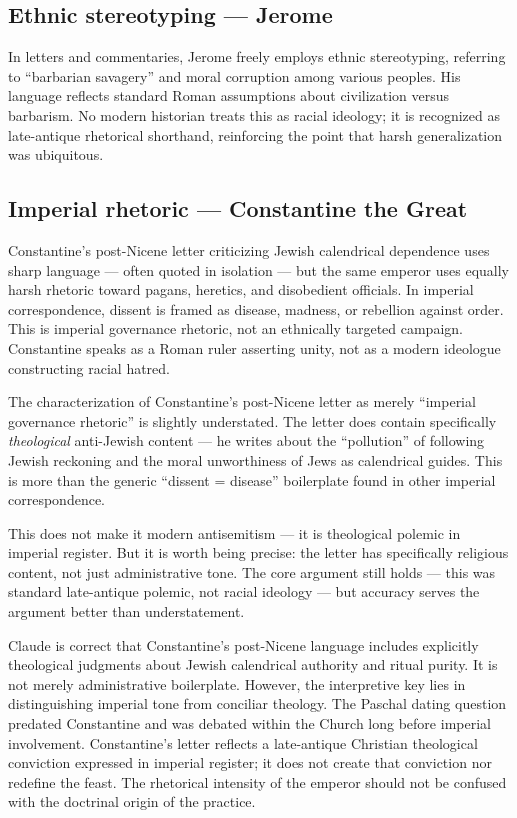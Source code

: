 \documentclass[10pt,twoside,openany]{book}
\begin{document}
\subsection{Ethnic stereotyping --- Jerome}

In letters and commentaries, Jerome freely employs ethnic stereotyping,
referring to ``barbarian savagery'' and moral corruption among various
peoples. His language reflects standard Roman assumptions about
civilization versus barbarism. No modern historian treats this as racial
ideology; it is recognized as late-antique rhetorical shorthand,
reinforcing the point that harsh generalization was ubiquitous.

\subsection{Imperial rhetoric --- Constantine the Great}

Constantine's post-Nicene letter criticizing Jewish calendrical
dependence uses sharp language --- often quoted in isolation --- but the
same emperor uses equally harsh rhetoric toward pagans, heretics, and
disobedient officials. In imperial correspondence, dissent is framed
as disease, madness, or rebellion against order. This is imperial
governance rhetoric, not an ethnically targeted campaign. Constantine
speaks as a Roman ruler asserting unity, not as a modern ideologue
constructing racial hatred.

\begin{reviewerbox}
The characterization of Constantine's post-Nicene
letter as merely ``imperial governance rhetoric'' is
slightly understated. The letter does contain
specifically \emph{theological} anti-Jewish content --- he
writes about the ``pollution'' of following Jewish
reckoning and the moral unworthiness of Jews as
calendrical guides. This is more than the generic
``dissent = disease'' boilerplate found in other imperial
correspondence.

This does not make it modern antisemitism --- it is
theological polemic in imperial register. But it is
worth being precise: the letter has specifically
religious content, not just administrative tone. The
core argument still holds --- this was standard late-antique polemic, not racial ideology --- but accuracy
serves the argument better than understatement.
\end{reviewerbox}

\begin{gptbox}
Claude is correct that Constantine's post-Nicene
language includes explicitly theological judgments about
Jewish calendrical authority and ritual purity. It is
not merely administrative boilerplate. However, the
interpretive key lies in distinguishing imperial tone
from conciliar theology. The Paschal dating question
predated Constantine and was debated within the Church
long before imperial involvement. Constantine's letter
reflects a late-antique Christian theological conviction
expressed in imperial register; it does not create that
conviction nor redefine the feast. The rhetorical
intensity of the emperor should not be confused with
the doctrinal origin of the practice.
\end{gptbox}
\end{document}
